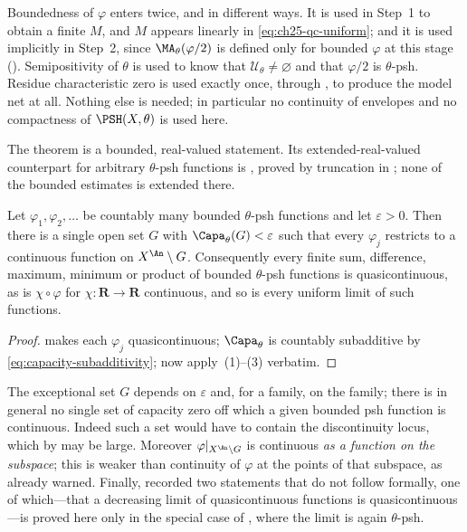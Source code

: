 \begin{remark}
\label{rem:ch25-qc-hypotheses}
Boundedness of $\varphi$ enters twice, and in different ways.  It is used
in Step~1 to obtain a finite $M$, and $M$ appears linearly in
\eqref{eq:ch25-qc-uniform}; and it is used implicitly in Step~2, since
$\MA_\theta(\varphi/2)$ is defined only for bounded $\varphi$ at this
stage ().  Semipositivity of $\theta$ is
used to know that $\mathcal U_\theta\neq\varnothing$ and that
$\varphi/2$ is $\theta$-psh.  Residue characteristic zero is used exactly
once, through , to produce the model
net at all.  Nothing else is needed; in particular no continuity of
envelopes and no compactness of $\PSH(X,\theta)$ is used here.

The theorem is a bounded, real-valued statement.  Its extended-real-valued
counterpart for arbitrary $\theta$-psh functions is
, proved by truncation in
; none of the bounded estimates is extended there.
\end{remark}

\begin{corollary}
\label{cor:ch25-quasicontinuity-calculus}
Let $\varphi_1,\varphi_2,\ldots$ be countably many bounded $\theta$-psh
functions and let $\varepsilon>0$.  Then there is a single open set $G$
with $\Capa_\theta(G)<\varepsilon$ such that every $\varphi_j$ restricts
to a continuous function on $X^{\An}\setminus G$.  Consequently every
finite sum, difference, maximum, minimum or product of bounded
$\theta$-psh functions is quasicontinuous, as is $\chi\circ\varphi$ for
$\chi:\mathbf R\to\mathbf R$ continuous, and so is every uniform limit of
such functions.
\end{corollary}

\begin{proof}
 makes each $\varphi_j$ quasicontinuous;
$\Capa_\theta$ is countably subadditive by
\eqref{eq:capacity-subadditivity}; now apply
\,(1)--(3) verbatim.
\end{proof}

\begin{remark}
\label{rem:ch25-qc-not}
The exceptional set $G$ depends on $\varepsilon$ and, for a family, on
the family; there is in general no single set of capacity zero off which a
given bounded psh function is continuous.  Indeed such a set would have to
contain the discontinuity locus, which by
 may be large.  Moreover
$\varphi|_{X^{\An}\setminus G}$ is continuous \emph{as a function on the
subspace}; this is weaker than continuity of $\varphi$ at the points of
that subspace, as  already warned.  Finally,
 recorded two statements that do not follow
formally, one of which---that a decreasing limit of quasicontinuous
functions is quasicontinuous---is proved here only in the special case of
, where the limit is again
$\theta$-psh.
\end{remark}

